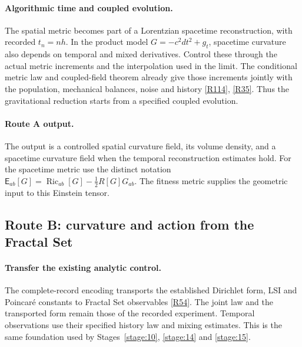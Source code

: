 \documentclass[11pt,a4paper]{article}
\begin{document}
\paragraph{Algorithmic time and coupled evolution.}
The spatial metric becomes part of a Lorentzian spacetime reconstruction,
with recorded $t_n=nh$. In the product model $G=-c^2dt^2+g_t$, spacetime
curvature also depends on temporal and mixed derivatives. Control these
through the actual metric increments and the interpolation used in the limit.
The conditional metric law and coupled-field theorem already give those
increments jointly with the population, mechanical balances, noise and history
\hyperref[src:thm-algorithmic-conditional-metric-law]{[R114]},
\hyperref[src:thm-algorithmic-coupled-field-system]{[R35]}.
Thus the gravitational reduction starts from a specified coupled evolution.

\paragraph{Route A output.}
The output is a controlled spatial curvature field, its volume density, and
a spacetime curvature field when the temporal reconstruction estimates hold.
For the spacetime metric use the distinct notation
$\mathsf E_{ab}[G]=\operatorname{Ric}_{ab}[G]-\tfrac12R[G]G_{ab}$.
The fitness metric supplies the geometric input to this Einstein tensor.

\clearpage
\subsection{Route B: curvature and action from the Fractal Set}
\label{sec:gravity-fractal-set}

\paragraph{Transfer the existing analytic control.}
The complete-record encoding transports the established Dirichlet form, LSI
and Poincar\'e constants to Fractal Set observables
\hyperref[src:prop-fractal-set-analytic-transfer]{[R54]}. The joint law and the transported form
remain those of the recorded experiment. Temporal observations use their
specified history law and mixing estimates. This is the same foundation used
by Stages~\ref{stage:10}, \ref{stage:14} and \ref{stage:15}.
\end{document}
